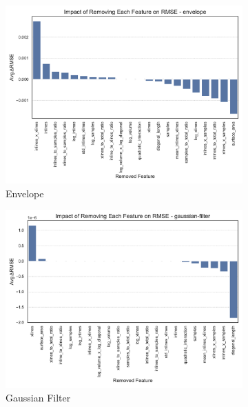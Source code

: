 \begin{figure}[htbp]
    \centering
    \begin{subfigure}[t]{0.32\textwidth}
        \includegraphics[width=\textwidth]{assets/images/05/feature_impact_envelope}
        \caption{Envelope}
    \end{subfigure}
    \hfill
    \begin{subfigure}[t]{0.32\textwidth}
        \includegraphics[width=\textwidth]{assets/images/05/feature_impact_gaussian-filter}
        \caption{Gaussian Filter}
    \end{subfigure}
    \hfill
    \begin{subfigure}[t]{0.32\textwidth}

\end{subfigure}
\end{figure}
